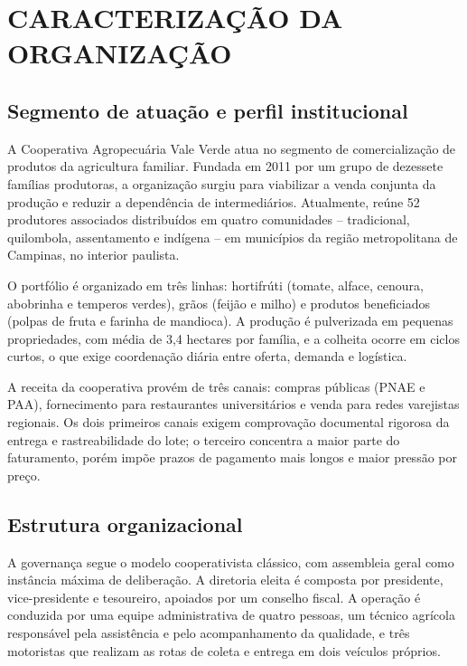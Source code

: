 \section{CARACTERIZAÇÃO DA ORGANIZAÇÃO}

\subsection{Segmento de atuação e perfil institucional}

A Cooperativa Agropecuária Vale Verde atua no segmento de comercialização de
produtos da agricultura familiar. Fundada em 2011 por um grupo de dezessete
famílias produtoras, a organização surgiu para viabilizar a venda conjunta da
produção e reduzir a dependência de intermediários. Atualmente, reúne 52
produtores associados distribuídos em quatro comunidades -- tradicional,
quilombola, assentamento e indígena -- em municípios da região metropolitana de
Campinas, no interior paulista.

O portfólio é organizado em três linhas: hortifrúti (tomate, alface, cenoura,
abobrinha e temperos verdes), grãos (feijão e milho) e produtos beneficiados
(polpas de fruta e farinha de mandioca). A produção é pulverizada em pequenas
propriedades, com média de 3,4 hectares por família, e a colheita ocorre em ciclos
curtos, o que exige coordenação diária entre oferta, demanda e logística.

A receita da cooperativa provém de três canais: compras públicas (PNAE e PAA),
fornecimento para restaurantes universitários e venda para redes varejistas
regionais. Os dois primeiros canais exigem comprovação documental rigorosa da
entrega e rastreabilidade do lote; o terceiro concentra a maior parte do
faturamento, porém impõe prazos de pagamento mais longos e maior pressão por
preço.

\subsection{Estrutura organizacional}

A governança segue o modelo cooperativista clássico, com assembleia geral como
instância máxima de deliberação. A diretoria eleita é composta por presidente,
vice-presidente e tesoureiro, apoiados por um conselho fiscal. A operação é
conduzida por uma equipe administrativa de quatro pessoas, um técnico agrícola
responsável pela assistência e pelo acompanhamento da qualidade, e três
motoristas que realizam as rotas de coleta e entrega em dois veículos próprios.


